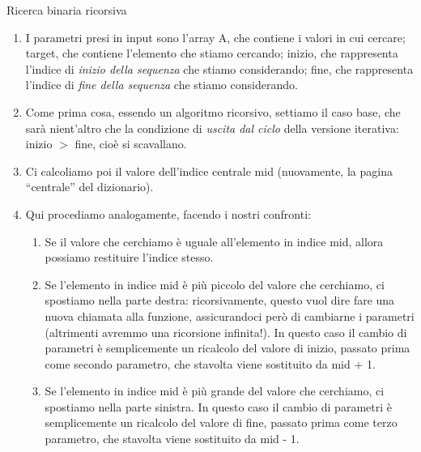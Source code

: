 \documentclass[12pt]{report}
\begin{document}
    \begin{algoritmo}{Ricerca binaria ricorsiva}{}
    			
    	\begin{enumerate}
    				
    		\item I parametri presi in input sono l’array A, che contiene i valori in cui cercare; target, che contiene l’elemento che stiamo cercando; inizio, che rappresenta l’indice di \textit{inizio della sequenza} che stiamo considerando; fine, che rappresenta l’indice di \textit{fine della sequenza} che stiamo considerando.
    				
    		\item Come prima cosa, essendo un algoritmo ricorsivo, settiamo il caso base, che sarà nient’altro che la condizione di \textit{uscita dal ciclo} della versione iterativa: inizio $>$ fine, cioè si scavallano.
    				
    		\item Ci calcoliamo poi il valore dell’indice centrale mid (nuovamente, la pagina “centrale” del dizionario).
    				
    		\item Qui procediamo analogamente, facendo i nostri confronti:
    				
    		\begin{enumerate}
    					
    			\item Se il valore che cerchiamo è uguale all’elemento in indice mid, allora possiamo restituire l’indice stesso.
    					
    			\item Se l’elemento in indice mid è più piccolo del valore che cerchiamo, ci spostiamo nella parte destra: ricorsivamente, questo vuol dire fare una nuova chiamata alla funzione, assicurandoci però di cambiarne i parametri (altrimenti avremmo una ricorsione infinita!). In questo caso il cambio di parametri è semplicemente un ricalcolo del valore di inizio, passato prima come secondo parametro, che stavolta viene sostituito da mid + 1.
    					
    			\item Se l’elemento in indice mid è più grande del valore che cerchiamo, ci spostiamo nella parte sinistra. In questo caso il cambio di parametri è semplicemente un ricalcolo del valore di fine, passato prima come terzo parametro, che stavolta viene sostituito da mid - 1.
    					
    		\end{enumerate}
    				
    	\end{enumerate}
    			
    \end{algoritmo}
    		
\end{document}
